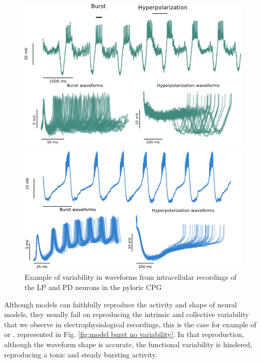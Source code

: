 \begin{figure}[hbt]
	\centering
	\begin{minipage}{0.45\textwidth}
		\includegraphics[width=\textwidth]{img/invariants/variability/lp_burst_variability.pdf}
	\end{minipage}
	\begin{minipage}{0.45\textwidth}
		\includegraphics[width=\textwidth]{img/invariants/variability/pd_burst_variability.pdf}
	\end{minipage}
	\caption{Example of variability in waveforms from intracellular recordings of the LP and PD neurons in the pyloric CPG}
	\label{fig:lp-pd burst variability}
\end{figure}

Although models can faithfully reproduce the activity and shape of neural models, they usually fail on reproducing the intrinsic and collective variability that we observe in electrophysiological recordings, this is the case for example of \cite{hodgkin_quantitative_1952} or \cite{vavoulis_dynamic_2007}, represented in Fig. \ref{fig:model burst no variability}. In that reproduction, although the waveform shape is accurate, the functional variability is hindered, reproducing a tonic and steady bursting activity. 

